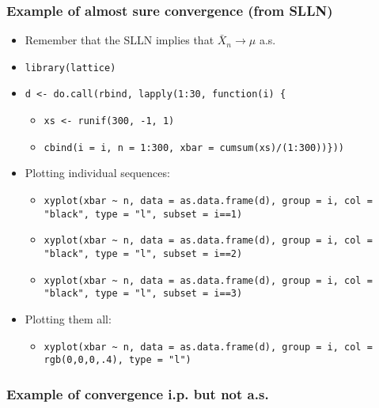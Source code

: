 \documentclass[11pt]{article}
\begin{document}
\subsubsection{Example of almost sure convergence (from SLLN)}
\label{sec-1-5-1}

\begin{itemize}
\item Remember that the SLLN implies that $\bar X_n \to \mu$ a.s.
\item \texttt{library(lattice)}
\item \texttt{d <- do.call(rbind, lapply(1:30, function(i) \{}
\begin{itemize}
\item \texttt{xs <- runif(300, -1, 1)}
\item \texttt{cbind(i = i, n = 1:300, xbar = cumsum(xs)/(1:300))\}))}
\end{itemize}
\item Plotting individual sequences:
\begin{itemize}
\item \texttt{xyplot(xbar \textasciitilde{} n, data = as.data.frame(d), group = i, col = "black", type = "l", subset = i==1)}
\item \texttt{xyplot(xbar \textasciitilde{} n, data = as.data.frame(d), group = i, col = "black", type = "l", subset = i==2)}
\item \texttt{xyplot(xbar \textasciitilde{} n, data = as.data.frame(d), group = i, col = "black", type = "l", subset = i==3)}
\end{itemize}
\item Plotting them all:
\begin{itemize}
\item \texttt{xyplot(xbar \textasciitilde{} n, data = as.data.frame(d), group = i, col = rgb(0,0,0,.4), type = "l")}
\end{itemize}
\end{itemize}
\subsubsection{Example of convergence i.p. but not a.s.}
\label{sec-1-5-2}
\end{document}
